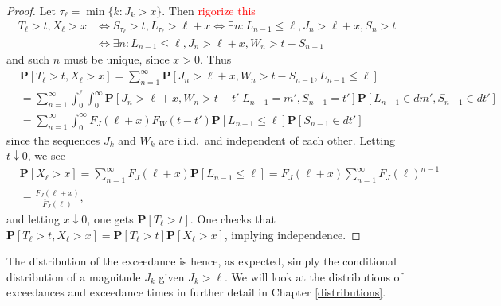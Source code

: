 \documentclass[honours,12pt]{unswthesis}
\newcommand{\pr}{\mathbf {P}}
\newcommand{\1}{\mathbf 1}
\numberwithin{equation}{section}
\theoremstyle{definition}
\theoremstyle{remark}
\begin{document}
\begin{proof}
Let $\tau_\ell = \min\{k: J_k > x\}$. Then \textcolor{red}{rigorize this}
\begin{align*}
T_\ell > t, X_\ell > x 
&\Longleftrightarrow
S_{\tau_\ell} > t, L_{\tau_\ell} > \ell + x
\Longleftrightarrow
\exists n: L_{n-1} \le \ell, J_n > \ell + x, S_n > t
\\
&\Longleftrightarrow
\exists n: L_{n-1} \le \ell, J_n > \ell + x, W_n > t - S_{n-1}
\end{align*}
and such $n$ must be unique, since $x > 0$.
Thus 
\begin{align*}
&\pr[T_\ell > t, X_\ell > x]
= \sum_{n=1}^\infty \pr[J_n > \ell + x, W_n > t - S_{n-1}, L_{n-1} \le \ell]
\\
&= \sum_{n=1}^\infty \int_0^\ell \int_0^\infty \pr[J_n > \ell + x, W_n > t - t' | L_{n-1} = m', 
S_{n-1} = t'] \pr[L_{n-1} \in dm', S_{n-1} \in dt']
\\
&= \sum_{n=1}^\infty \int_0^\infty \overline F_J(\ell + x) \overline F_W(t - t')
\pr[L_{n-1} \le \ell] \pr[S_{n-1} \in dt']
\end{align*}
since the sequences $J_k$ and $W_k$ are i.i.d.\ and independent of each other.
Letting $t \downarrow 0$, we see
\begin{align*}
&\pr[X_\ell > x] 
= \sum_{n=1}^\infty \overline F_J(\ell+x) \pr[L_{n-1} \le \ell] 
= \overline F_J(\ell+x) \sum_{n=1}^\infty F_J(\ell)^{n-1}
\\
&= \frac{\overline F_J(\ell + x)}{\overline F_J(\ell)},
\end{align*}
and letting $x \downarrow 0$, one gets $\pr[T_\ell > t]$. 
One checks that $\pr[T_\ell > t, X_\ell > x] = \pr[T_\ell > t] \pr[X_\ell > x]$, implying independence.
\end{proof}
\noindent The distribution of the exceedance is hence, as expected, simply the
conditional distribution of a magnitude $J_k$ given $J_k > \ell$. We will look at the distributions of exceedances and exceedance times in further detail in Chapter \ref{distributions}.
\end{document}
